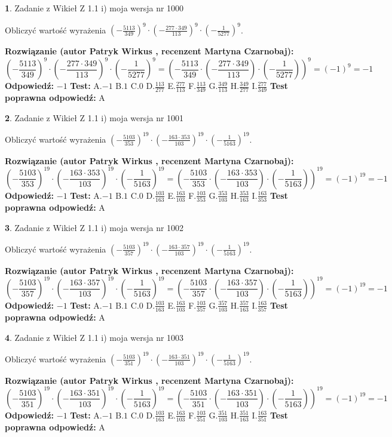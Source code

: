 \documentclass[12pt, a4paper]{article}
\theoremstyle{definition} %
\newtheorem{zad}{}
\newcommand{\zadStart}[1]{\begin{zad}#1\newline}
\newcommand{\zadStop}{\end{zad}}
\newcommand{\rozwStart}[2]{\noindent \textbf{Rozwiązanie (autor #1 , recenzent #2): }\newline}
\newcommand{\rozwStop}{\newline}
\newcommand{\odpStart}{\noindent \textbf{Odpowiedź:}\newline}
\newcommand{\odpStop}{\newline}
\newcommand{\testStart}{\noindent \textbf{Test:}\newline}
\newcommand{\testStop}{\newline}
\newcommand{\kluczStart}{\noindent \textbf{Test poprawna odpowiedź:}\newline}
\newcommand{\kluczStop}{\newline}
\begin{document}
\zadStart{Zadanie z Wikieł Z 1.1 i) moja wersja nr 1000}

Obliczyć wartość wyrażenia $(-\frac{5113}{349})^{9} \cdot (-\frac{277 \cdot 349}{113})^{9} \cdot (-\frac{1}{5277})^{9}$.
\zadStop
\rozwStart{Patryk Wirkus}{Martyna Czarnobaj}
$$(-\frac{5113}{349})^{9} \cdot (-\frac{277 \cdot 349}{113})^{9} \cdot (-\frac{1}{5277})^{9} = (-\frac{5113}{349} \cdot (-\frac{277 \cdot 349}{113}) \cdot (-\frac{1}{5277}))^{9} = (-1)^{9} = -1$$
\rozwStop
\odpStart
$-1$
\odpStop
\testStart
A.$-1$ B.$1$ C.$0$ D.$\frac{113}{277}$ E.$\frac{277}{113}$
F.$\frac{113}{349}$ G.$\frac{349}{113}$
H.$\frac{349}{277}$
I.$\frac{277}{349}$
\testStop
\kluczStart
A
\kluczStop



\zadStart{Zadanie z Wikieł Z 1.1 i) moja wersja nr 1001}

Obliczyć wartość wyrażenia $(-\frac{5103}{353})^{19} \cdot (-\frac{163 \cdot 353}{103})^{19} \cdot (-\frac{1}{5163})^{19}$.
\zadStop
\rozwStart{Patryk Wirkus}{Martyna Czarnobaj}
$$(-\frac{5103}{353})^{19} \cdot (-\frac{163 \cdot 353}{103})^{19} \cdot (-\frac{1}{5163})^{19} = (-\frac{5103}{353} \cdot (-\frac{163 \cdot 353}{103}) \cdot (-\frac{1}{5163}))^{19} = (-1)^{19} = -1$$
\rozwStop
\odpStart
$-1$
\odpStop
\testStart
A.$-1$ B.$1$ C.$0$ D.$\frac{103}{163}$ E.$\frac{163}{103}$
F.$\frac{103}{353}$ G.$\frac{353}{103}$
H.$\frac{353}{163}$
I.$\frac{163}{353}$
\testStop
\kluczStart
A
\kluczStop



\zadStart{Zadanie z Wikieł Z 1.1 i) moja wersja nr 1002}

Obliczyć wartość wyrażenia $(-\frac{5103}{357})^{19} \cdot (-\frac{163 \cdot 357}{103})^{19} \cdot (-\frac{1}{5163})^{19}$.
\zadStop
\rozwStart{Patryk Wirkus}{Martyna Czarnobaj}
$$(-\frac{5103}{357})^{19} \cdot (-\frac{163 \cdot 357}{103})^{19} \cdot (-\frac{1}{5163})^{19} = (-\frac{5103}{357} \cdot (-\frac{163 \cdot 357}{103}) \cdot (-\frac{1}{5163}))^{19} = (-1)^{19} = -1$$
\rozwStop
\odpStart
$-1$
\odpStop
\testStart
A.$-1$ B.$1$ C.$0$ D.$\frac{103}{163}$ E.$\frac{163}{103}$
F.$\frac{103}{357}$ G.$\frac{357}{103}$
H.$\frac{357}{163}$
I.$\frac{163}{357}$
\testStop
\kluczStart
A
\kluczStop



\zadStart{Zadanie z Wikieł Z 1.1 i) moja wersja nr 1003}

Obliczyć wartość wyrażenia $(-\frac{5103}{351})^{19} \cdot (-\frac{163 \cdot 351}{103})^{19} \cdot (-\frac{1}{5163})^{19}$.
\zadStop
\rozwStart{Patryk Wirkus}{Martyna Czarnobaj}
$$(-\frac{5103}{351})^{19} \cdot (-\frac{163 \cdot 351}{103})^{19} \cdot (-\frac{1}{5163})^{19} = (-\frac{5103}{351} \cdot (-\frac{163 \cdot 351}{103}) \cdot (-\frac{1}{5163}))^{19} = (-1)^{19} = -1$$
\rozwStop
\odpStart
$-1$
\odpStop
\testStart
A.$-1$ B.$1$ C.$0$ D.$\frac{103}{163}$ E.$\frac{163}{103}$
F.$\frac{103}{351}$ G.$\frac{351}{103}$
H.$\frac{351}{163}$
I.$\frac{163}{351}$
\testStop
\kluczStart
A
\kluczStop
\end{document}
